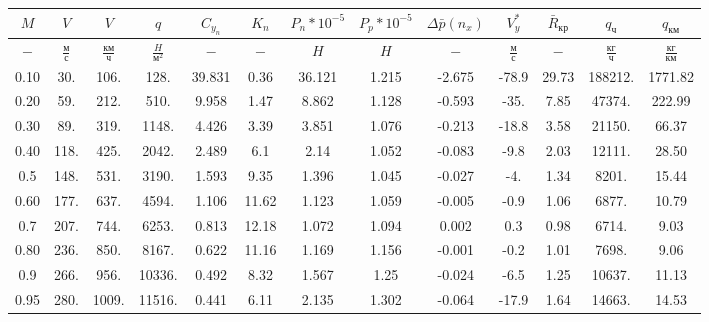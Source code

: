 \begin{tabular}{|c|c|c|c|c|c|c|c|c|c|c|c|c|}
\hline
$M$ & $V$ & $V$ & $q$ & $C_{y_n}$ & $K_n$ & $P_n*10^{-5}$ & $P_p*10^{-5}$ & $\Delta \bar{p}(n_x)$ & $V_y^*$ & $\bar{R}_{кр}$ & $q_{ч}$ & $q_{км}$ \\ 
\hline
$-$ & $\frac{м}{с}$ & $\frac{км}{ч}$ & $\frac{H}{м^2}$ & $-$ & $-$ & $H$ & $H$ & $-$ & $\frac{м}{с}$ & $-$ & $\frac{кг}{ч}$ & $\frac{кг}{км}$ \\ 
\hline
0.10 & 30. & 106. & 128. & 39.831 & 0.36 & 36.121 & 1.215 & -2.675 & -78.9 & 29.73 & 188212. & 1771.82 \\ 
\hline
0.20 & 59. & 212. & 510. & 9.958 & 1.47 & 8.862 & 1.128 & -0.593 & -35. & 7.85 & 47374. & 222.99 \\ 
\hline
0.30 & 89. & 319. & 1148. & 4.426 & 3.39 & 3.851 & 1.076 & -0.213 & -18.8 & 3.58 & 21150. & 66.37 \\ 
\hline
0.40 & 118. & 425. & 2042. & 2.489 & 6.1 & 2.14 & 1.052 & -0.083 & -9.8 & 2.03 & 12111. & 28.50 \\ 
\hline
0.5 & 148. & 531. & 3190. & 1.593 & 9.35 & 1.396 & 1.045 & -0.027 & -4. & 1.34 & 8201. & 15.44 \\ 
\hline
0.60 & 177. & 637. & 4594. & 1.106 & 11.62 & 1.123 & 1.059 & -0.005 & -0.9 & 1.06 & 6877. & 10.79 \\ 
\hline
0.7 & 207. & 744. & 6253. & 0.813 & 12.18 & 1.072 & 1.094 & 0.002 & 0.3 & 0.98 & 6714. & 9.03 \\ 
\hline
0.80 & 236. & 850. & 8167. & 0.622 & 11.16 & 1.169 & 1.156 & -0.001 & -0.2 & 1.01 & 7698. & 9.06 \\ 
\hline
0.9 & 266. & 956. & 10336. & 0.492 & 8.32 & 1.567 & 1.25 & -0.024 & -6.5 & 1.25 & 10637. & 11.13 \\ 
\hline
0.95 & 280. & 1009. & 11516. & 0.441 & 6.11 & 2.135 & 1.302 & -0.064 & -17.9 & 1.64 & 14663. & 14.53 \\ 
\hline
\end{tabular}